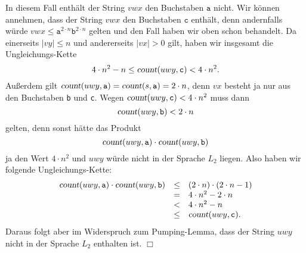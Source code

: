 \documentclass{article}
\newcommand{\qed}{\hspace*{\fill} $\Box$}
\begin{document}
\begin{enumerate}
\begin{enumerate}
            In diesem Fall enth\"alt der String $vwx$ den Buchstaben $\mathtt{a}$ nicht.
            Wir k\"onnen annehmen, dass der String $vwx$ den Buchstaben $\mathtt{c}$ enth\"alt, denn
            andernfalls w\"urde $vwx \leq \texttt{a}^{2\cdot n}\texttt{b}^{2\cdot n}$ gelten und den Fall
            haben wir oben schon behandelt.  Da einerseits $|vy| \leq n$ und andererseits $|vx| > 0$ gilt,
            haben wir insgesamt die Ungleichungs-Kette
            \[ 4\cdot n^2 - n \leq \textsl{count}(uwy,\texttt{c}) < 4\cdot n^2. \]
            Au{\ss}erdem gilt $\textsl{count}(uwy,\texttt{a}) = \textsl{count}(s,\texttt{a}) = 2\cdot n$,
            denn $vx$ besteht ja nur aus den Buchstaben \texttt{b} und \texttt{c}.
            Wegen $\textsl{count}(uwy,\texttt{c}) < 4\cdot n^2$ muss dann
            \[ \textsl{count}(uwy,\texttt{b}) < 2\cdot n \]
            gelten, denn sonst h\"atte das Produkt 
            \[ \textsl{count}(uwy, \texttt{a}) \cdot \textsl{count}(uwy, \texttt{b}) \]
            ja den Wert $4\cdot n^2$
            und  $uwy$ w\"urde nicht in der Sprache $L_2$ liegen.  Also haben wir
            folgende Ungleichungs-Kette:
            \[ 
            \begin{array}[t]{lcl}
              \textsl{count}(uwy, \texttt{a}) \cdot \textsl{count}(uwy, \texttt{b}) 
              & \leq & (2\cdot n) \cdot (2\cdot n - 1) \\
              & =    & 4 \cdot n^2 - 2 \cdot n \\
              & <    & 4 \cdot n^2 - n \\
              & \leq & \textsl{count}(uwy, \texttt{c}).
            \end{array}
            \]
            Daraus folgt aber im Widerspruch zum Pumping-Lemma, dass der String $uwy$ nicht in der
            Sprache $L_2$ enthalten ist. \qed
      \end{enumerate}
\end{enumerate}
\end{document}
